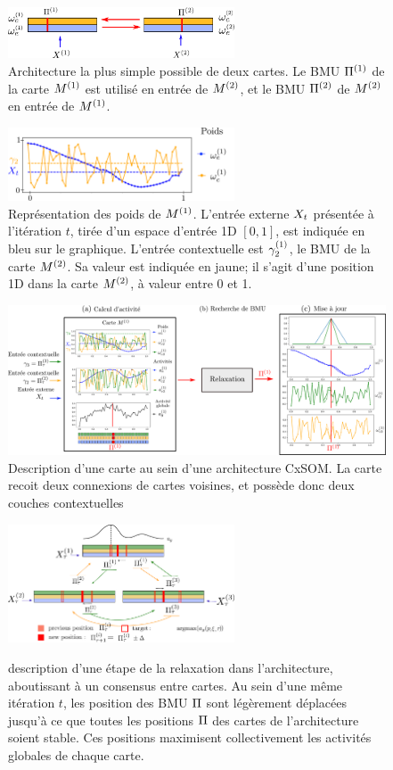 \begin{figure}
\centering
\includegraphics[width=0.6\textwidth]{archi_2som}
\caption{Architecture la plus simple possible de deux cartes. Le BMU $\Pi^{({1})}$ de la carte $M^{({1})}$ est utilisé en entrée de $M^{({2})}$, et le BMU $\Pi^{({2})}$ de $M^{({2})}$ en entrée de $M^{({1})}$.}
\end{figure}
\begin{figure}
\centering
\includegraphics[width=0.6\textwidth]{weights_2som.pdf}
\caption{Représentation des poids de $M^{({1})}$. L'entrée externe $X_t$ présentée à l'itération $t$, tirée d'un espace d'entrée 1D $[0,1]$, est indiquée en bleu sur le graphique. L'entrée contextuelle  est $\gamma^{({1})}_2$, le BMU de la carte $M^{({2})}$. Sa valeur est indiquée en jaune; il s'agit d'une position 1D dans la carte $M^{({2})}$, à valeur entre 0 et 1. }
\end{figure}
\begin{figure}
\centering
\includegraphics[width=\textwidth]{map_2layers.pdf}
\caption{Description d'une carte au sein d'une architecture CxSOM. La carte recoit deux connexions de cartes voisines, et possède donc deux couches contextuelles}
\label{fig:one_map}
\end{figure}
\begin{figure}
\centering
\includegraphics[width=0.6\textwidth]{relaxation.pdf}
\label{fig:relax}
\caption{description d'une étape de la relaxation dans l'architecture, aboutissant à un consensus entre cartes. Au sein d'une même itération $t$, les position des BMU $\Pi$ sont légèrement déplacées jusqu'à ce que toutes les positions $\Pi$ des cartes de l'architecture soient stable. Ces positions maximisent collectivement les activités globales de chaque carte. }
\end{figure}

